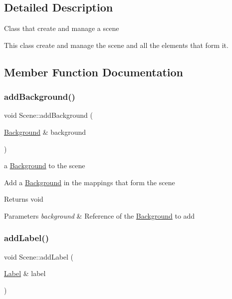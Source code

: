 \subsection{Detailed Description}
Class that create and manage a scene

This class create and manage the scene and all the elements that form it. 

\subsection{Member Function Documentation}
\mbox{\label{class_scene_a07d6d13ed45e8882192bed7330e5383a}} 
\subsubsection{\texorpdfstring{add\+Background()}{addBackground()}}
{\footnotesize\ttfamily void Scene\+::add\+Background (\begin{DoxyParamCaption}\item[{\hyperlink{class_background}{Background} \&}]{background }\end{DoxyParamCaption})}

a \hyperlink{class_background}{Background} to the scene

Add a \hyperlink{class_background}{Background} in the mappings that form the scene

\begin{DoxyReturn}{Returns}
void 
\end{DoxyReturn}

\begin{DoxyParams}{Parameters}
{\em background} & Reference of the \hyperlink{class_background}{Background} to add \\
\hline
\end{DoxyParams}
\mbox{\label{class_scene_a4327310c11ae2f3130ddb61ed20cfda3}} 
\subsubsection{\texorpdfstring{add\+Label()}{addLabel()}}
{\footnotesize\ttfamily void Scene\+::add\+Label (\begin{DoxyParamCaption}\item[{\hyperlink{class_label}{Label} \&}]{label }\end{DoxyParamCaption})}

